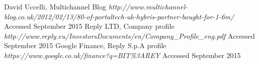 \documentclass[titlepage]{article}
\begin{document}
 \begin{thebibliography}{1}
 	
 	 David Uccelli, Multichannel Blog {\em http://www.multichannel-blog.co.uk/2012/02/13/80-of-portaltech-uk-hybris-partner-bought-for-1-6m/} Accessed September 2015
 	 Reply LTD, Company profile {\em http://www.reply.eu/InvestorsDocuments/en/Company\_Profile\_eng.pdf} Accessed September 2015
 	 Google Finance, Reply S.p.A profile {\em https://www.google.co.uk/finance?q=BIT\%3AREY} Accessed September 2015
 	
 	
 	
 	
 		

	


 \end{thebibliography}
\end{document}
